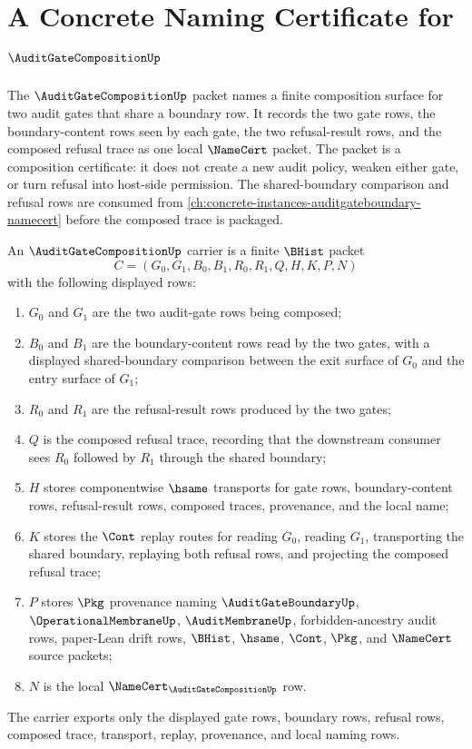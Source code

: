 \chapter{A Concrete Naming Certificate for $\AuditGateCompositionUp$}
\label{ch:concrete-instances-auditgatecomposition-namecert}

The $\AuditGateCompositionUp$ packet names a finite composition surface for
two audit gates that share a boundary row. It records the two gate rows, the
boundary-content rows seen by each gate, the two refusal-result rows, and the
composed refusal trace as one local $\NameCert$ packet. The packet is a
composition certificate: it does not create a new audit policy, weaken either
gate, or turn refusal into host-side permission.
The shared-boundary comparison and refusal rows are consumed from
\autoref{ch:concrete-instances-auditgateboundary-namecert} before the composed
trace is packaged.

\begin{definition}
\label{def:audit-gate-composition-carrier}
An $\AuditGateCompositionUp$ carrier is a finite $\BHist$ packet
$$
C=(G_0,G_1,B_0,B_1,R_0,R_1,Q,H,K,P,N)
$$
with the following displayed rows:
\begin{enumerate}
\item $G_0$ and $G_1$ are the two audit-gate rows being composed;
\item $B_0$ and $B_1$ are the boundary-content rows read by the two gates,
with a displayed shared-boundary comparison between the exit surface of
$G_0$ and the entry surface of $G_1$;
\item $R_0$ and $R_1$ are the refusal-result rows produced by the two gates;
\item $Q$ is the composed refusal trace, recording that the downstream
consumer sees $R_0$ followed by $R_1$ through the shared boundary;
\item $H$ stores componentwise $\hsame$ transports for gate rows,
boundary-content rows, refusal-result rows, composed traces, provenance, and
the local name;
\item $K$ stores the $\Cont$ replay routes for reading $G_0$, reading
$G_1$, transporting the shared boundary, replaying both refusal rows, and
projecting the composed refusal trace;
\item $P$ stores $\Pkg$ provenance naming $\AuditGateBoundaryUp$,
$\OperationalMembraneUp$, $\AuditMembraneUp$, forbidden-ancestry audit rows,
paper-Lean drift rows, $\BHist$, $\hsame$, $\Cont$, $\Pkg$, and $\NameCert$
source packets;
\item $N$ is the local $\NameCert_{\AuditGateCompositionUp}$ row.
\end{enumerate}
The carrier exports only the displayed gate rows, boundary rows, refusal rows,
composed trace, transport, replay, provenance, and local naming rows.
\end{definition}

